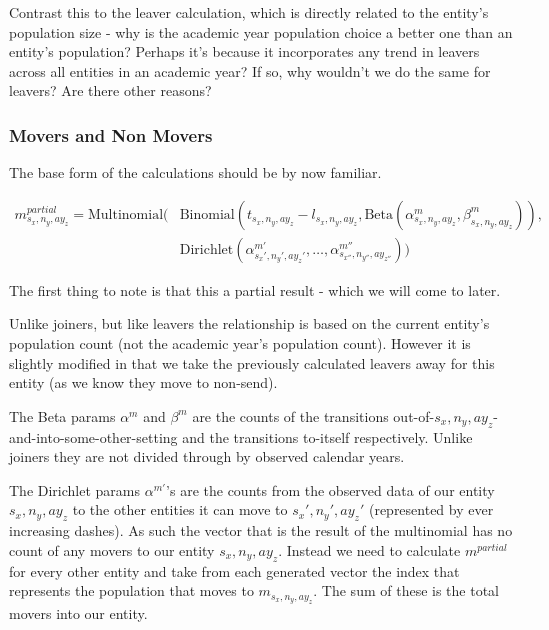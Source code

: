 \documentclass[margin=5mm]{article}
\begin{document}
Contrast this to the leaver calculation, which is directly related to
the entity's population size - why is the academic year population
choice a better one than an entity's population?  Perhaps it's because
it incorporates any trend in leavers across all entities in an
academic year?  If so, why wouldn't we do the same for leavers?  Are
there other reasons?

\subsubsection{Movers and Non Movers}


The base form of the calculations should be by now familiar.

\begin{equation*}
  \begin{split}
m^{partial}_{s_x,n_y,ay_z} =
\text{Multinomial}( & \text{Binomial}(t_{s_x,n_y,ay_z} - l_{s_x,n_y,ay_z}, 
 \text{Beta}(\alpha^m_{s_x,n_y,ay_z},\beta^m_{s_x,n_y,ay_z})),
\\ &  \text{Dirichlet}(\alpha^{m'}_{s_x',n_y',ay_z'}, \dots,
\alpha^{m''}_{s_{x''},n_{y''},ay_{z''}}))
\end{split}
\end{equation*}

The first thing to note is that this a partial result - which we will
come to later.

Unlike joiners, but like leavers the relationship is based on the
current entity's population count (not the academic year's population
count).  However it is slightly modified in that we take the
previously calculated leavers away for this entity (as we know they
move to non-send).

The Beta params $\alpha^m$ and $\beta^m$ are the counts of the
transitions out-of-${s_x,n_y,ay_z}$-and-into-some-other-setting and the
transitions to-itself respectively.  Unlike joiners they are not
divided through by observed calendar years.

The Dirichlet params $\alpha^{m'}$'s are the counts from the observed
data of our entity ${s_x,n_y,ay_z}$ to the other entities it can move
to ${s_x',n_y',ay_z'}$ (represented by ever increasing dashes).  As
such the vector that is the result of the multinomial has no count of
any movers to our entity ${s_x,n_y,ay_z}$.  Instead we need to
calculate $m^{partial}$ for every other entity and take from each
generated vector the index that represents the population that moves
to $m_{s_x,n_y,ay_z}$.  The sum of these is the total movers into our
entity.
\end{document}
